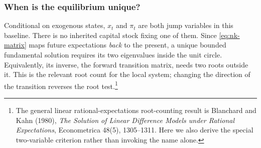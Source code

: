 \subsubsection{When is the equilibrium unique?}

Conditional on exogenous states, $x_t$ and $\pi_t$ are both jump variables in
this baseline. There is no inherited capital stock fixing one of them. Since
\eqref{eq:nk-matrix} maps future expectations \emph{back} to the present, a
unique bounded fundamental solution requires its two eigenvalues inside the
unit circle. Equivalently, its inverse, the forward transition matrix, needs
two roots outside it. This is the relevant root count for the local system;
changing the direction of the transition reverses the root test.\footnote{The
general linear rational-expectations root-counting result is Blanchard and
Kahn (1980), \textit{The Solution of Linear Difference Models under Rational
Expectations}, Econometrica 48(5), 1305--1311. Here we also derive the
special two-variable criterion rather than invoking the name alone.}

